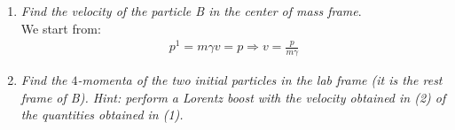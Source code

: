 \documentclass[../template.tex]{subfiles}
\begin{document}
\begin{enumerate}
    \item \textit{Find the velocity of the particle B in the center of mass frame}.\\
    We start from:
    \begin{align*}
        p^1 = m \gamma v = p \Rightarrow v = \frac{p}{m \gamma}    
    \end{align*}
    \item \textit{Find the $4$-momenta of the two initial particles in the lab frame (it is the rest frame of B). Hint: perform a Lorentz boost with the velocity obtained in (2) of the quantities obtained in (1).}   
\end{enumerate}

 
\end{document}
